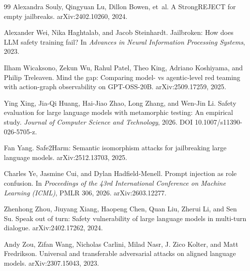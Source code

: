 \documentclass{article}
\begin{document}
\begin{thebibliography}{99}
Alexandra Souly, Qingyuan Lu, Dillon Bowen, et~al.
\newblock A StrongREJECT for empty jailbreaks.
\newblock arXiv:2402.10260, 2024.

Alexander Wei, Nika Haghtalab, and Jacob Steinhardt.
\newblock Jailbroken: How does LLM safety training fail?
\newblock In \emph{Advances in Neural Information Processing Systems}, 2023.

Ilham Wicaksono, Zekun Wu, Rahul Patel, Theo King, Adriano Koshiyama, and Philip
Treleaven.
\newblock Mind the gap: Comparing model- vs agentic-level red teaming with action-graph
observability on GPT-OSS-20B.
\newblock arXiv:2509.17259, 2025.

Ying Xing, Jia-Qi Huang, Hai-Jiao Zhao, Long Zhang, and Wen-Jin Li.
\newblock Safety evaluation for large language models with metamorphic testing: An empirical
study.
\newblock \emph{Journal of Computer Science and Technology}, 2026.
\newblock DOI 10.1007/s11390-026-5705-z.

Fan Yang.
\newblock Safe2Harm: Semantic isomorphism attacks for jailbreaking large language models.
\newblock arXiv:2512.13703, 2025.

Charles Ye, Jasmine Cui, and Dylan Hadfield-Menell.
\newblock Prompt injection as role confusion.
\newblock In \emph{Proceedings of the 43rd International Conference on Machine
Learning (ICML)}, PMLR 306, 2026.
\newblock arXiv:2603.12277.

Zhenhong Zhou, Jiuyang Xiang, Haopeng Chen, Quan Liu, Zherui Li, and Sen Su.
\newblock Speak out of turn: Safety vulnerability of large language models in multi-turn
dialogue.
\newblock arXiv:2402.17262, 2024.

Andy Zou, Zifan Wang, Nicholas Carlini, Milad Nasr, J. Zico Kolter, and Matt
Fredrikson.
\newblock Universal and transferable adversarial attacks on aligned language models.
\newblock arXiv:2307.15043, 2023.

\end{thebibliography}
\end{document}
